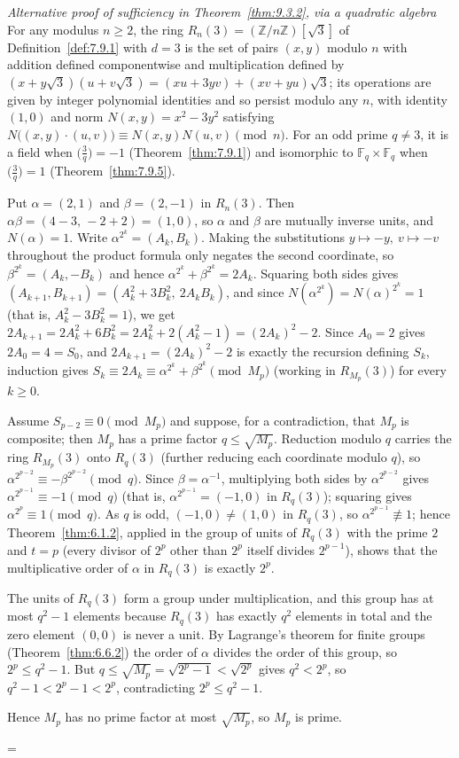 \documentclass[11pt]{article}
\makeatletter
\let\nt@closedisplay\]
\def\nt@guardedclose{\@ifnextchar\par{\nt@closeafterpar}{\@ifnextchar\end{\postdisplaypenalty\@M\nt@closedisplay}{\nt@closedisplay}}}
\def\nt@closeafterpar\par{\@ifnextchar\par{\nt@closeafterpar}{\@ifnextchar\end{\postdisplaypenalty\@M\nt@closedisplay\par}{\nt@closedisplay\par}}}
\renewenvironment{proof}[1][\proofname]{\par
  \pushQED{\qed}\normalfont\topsep\medskipamount\edef\nt@afterproof{\@endparpenalty=\the\@endparpenalty\relax}\@beginparpenalty\@M\@endparpenalty\@M\let\]\nt@guardedclose\trivlist\item[]\textit{#1\@addpunct{.}} \ignorespaces}{\ifvmode\addpenalty\@M\fi\popQED\nt@afterproof\endtrivlist\@endpefalse}
\theoremstyle{ntstyle}
\newenvironment{altproof}[1][\proofname]
  {\begin{proof}[#1]\renewcommand{\qedsymbol}{}}{\end{proof}}
\newcommand{\legs}[2]{\bigl(\tfrac{#1}{#2}\bigr)}
\makeatother
\begin{document}
\begin{altproof}[Alternative proof of sufficiency in Theorem~\ref{thm:9.3.2}, via a quadratic algebra]
  For any modulus $n\ge2$, the ring
  $R_n(3)=(\mathbb{Z}/n\mathbb{Z})[\sqrt{3}]$ of
  Definition~\ref{def:7.9.1} with $d=3$ is the set of pairs $(x,y)$ modulo
  $n$ with addition defined componentwise and multiplication defined by
  $(x+y\sqrt{3})(u+v\sqrt{3})=(xu+3yv)+(xv+yu)\sqrt{3}$; its operations
  are given by integer polynomial identities and so persist modulo any $n$, with
  identity $(1,0)$ and norm $N(x,y)=x^{2}-3y^{2}$ satisfying
  $N\big((x,y)\cdot(u,v)\big)\equiv N(x,y)N(u,v)\pmod{n}$. For an odd prime
  $q\neq3$, it is a field when $\legs{3}{q}=-1$
  (Theorem~\ref{thm:7.9.1}) and isomorphic to
  $\mathbb{F}_q\times\mathbb{F}_q$ when
  $\legs{3}{q}=1$ (Theorem~\ref{thm:7.9.5}).

  Put $\alpha=(2,1)$ and $\beta=(2,-1)$ in $R_n(3)$. Then
  $\alpha\beta=(4-3,\,-2+2)=(1,0)$, so $\alpha$ and $\beta$ are
  mutually inverse units, and $N(\alpha)=1$. Write
  $\alpha^{2^k}=(A_k,B_k)$. Making the substitutions $y\mapsto-y,\ v\mapsto-v$
  throughout the product formula only negates the second coordinate, so
  $\beta^{2^k}=(A_k,-B_k)$ and hence $\alpha^{2^k}+\beta^{2^k}=2A_k$.
  Squaring both sides gives $(A_{k+1},B_{k+1})=(A_k^2+3B_k^2,\ 2A_kB_k)$, and
  since $N(\alpha^{2^k})=N(\alpha)^{2^k}=1$ (that is, $A_k^2-3B_k^2=1$),
  we get $2A_{k+1}=2A_k^2+6B_k^2=2A_k^2+2(A_k^2-1)=(2A_k)^2-2$. Since $A_0=2$ gives $2A_0=4=S_0$, and
  $2A_{k+1}=(2A_k)^2-2$ is exactly the
  recursion defining $S_k$, induction gives
  $S_k\equiv2A_k\equiv\alpha^{2^k}+\beta^{2^k}\pmod{M_p}$ (working in
  $R_{M_p}(3)$) for every $k\ge0$.

  Assume $S_{p-2}\equiv0\pmod{M_p}$ and suppose, for a contradiction,
  that $M_p$ is composite; then $M_p$ has a prime factor
  $q\le\sqrt{M_p}$. Reduction modulo $q$ carries the ring $R_{M_p}(3)$ onto
  $R_q(3)$ (further reducing each coordinate modulo $q$), so
  $\alpha^{2^{p-2}}\equiv-\beta^{2^{p-2}}\pmod{q}$. Since
  $\beta=\alpha^{-1}$, multiplying both sides by $\alpha^{2^{p-2}}$
  gives $\alpha^{2^{p-1}}\equiv-1\pmod{q}$ (that is, $\alpha^{2^{p-1}}=(-1,0)$ in $R_q(3)$); squaring gives
  $\alpha^{2^{p}}\equiv1\pmod{q}$. As $q$ is odd, $(-1,0)\neq(1,0)$ in
  $R_q(3)$, so $\alpha^{2^{p-1}}\not\equiv1$; hence Theorem~\ref{thm:6.1.2}, applied in the group
  of units of $R_q(3)$ with the prime $2$ and $t=p$ (every divisor of $2^p$
  other than $2^p$ itself divides $2^{p-1}$), shows that the multiplicative
  order of $\alpha$ in $R_q(3)$ is exactly $2^p$.

  The units of $R_q(3)$ form a group under multiplication, and this group has at most
  $q^2-1$ elements because $R_q(3)$ has exactly $q^2$ elements in total
  and the zero element $(0,0)$ is never a unit. By Lagrange's theorem for finite groups (Theorem~\ref{thm:6.6.2})
  the order of $\alpha$ divides the order of this group, so $2^p\le q^2-1$. But
  $q\le\sqrt{M_p}=\sqrt{2^p-1}<\sqrt{2^p}$ gives $q^2<2^p$,
  so $q^2-1<2^p-1<2^p$, contradicting $2^p\le q^2-1$.

  Hence $M_p$ has no prime factor at most $\sqrt{M_p}$, so $M_p$ is prime.

\end{altproof}
\end{document}
